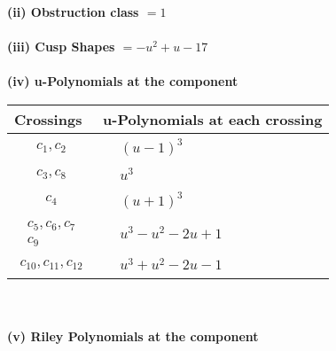 \documentclass[1p]{elsarticle_modified}
\theoremstyle{definition}
\begin{document}
\flushleft \textbf{(ii) Obstruction class $= 1$}\\~\\
\flushleft \textbf{(iii) Cusp Shapes $= - u^2+u-17$}\\~\\
\newpage\renewcommand{\arraystretch}{1}
\flushleft \textbf{(iv) u-Polynomials at the component}\newline \\
\begin{tabular}{m{50pt}|m{274pt}}
Crossings & \hspace{64pt}u-Polynomials at each crossing \\
\hline $$\begin{aligned}c_{1},c_{2}\end{aligned}$$&$\begin{aligned}
&(u-1)^3
\end{aligned}$\\
\hline $$\begin{aligned}c_{3},c_{8}\end{aligned}$$&$\begin{aligned}
&u^3
\end{aligned}$\\
\hline $$\begin{aligned}c_{4}\end{aligned}$$&$\begin{aligned}
&(u+1)^3
\end{aligned}$\\
\hline $$\begin{aligned}c_{5},c_{6},c_{7}\\c_{9}\end{aligned}$$&$\begin{aligned}
&u^3- u^2-2 u+1
\end{aligned}$\\
\hline $$\begin{aligned}c_{10},c_{11},c_{12}\end{aligned}$$&$\begin{aligned}
&u^3+u^2-2 u-1
\end{aligned}$\\
\hline
\end{tabular}\\~\\
\newpage\renewcommand{\arraystretch}{1}
\flushleft \textbf{(v) Riley Polynomials at the component}\newline \\
\end{document}
